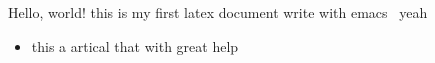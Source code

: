 \documentclass{article}
\begin{document}
Hello, world!
this is my first latex document write with emacs~ yeah
\begin{itemize}
\item this a artical that with great help
\end{itemize}
\end{document}
